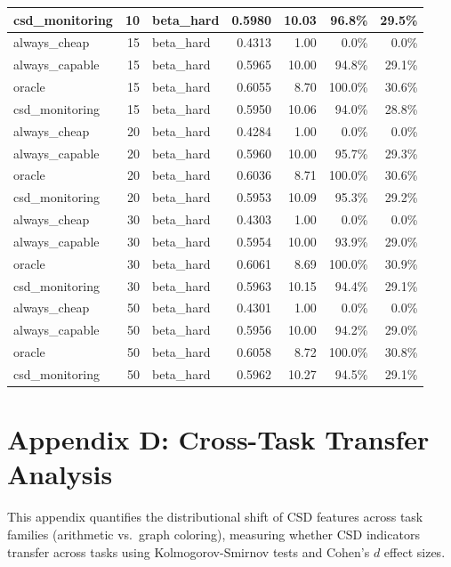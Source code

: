 \documentclass[11pt]{article}
\begin{document}
\begin{table}[h]
\begin{tabular}{l|r|l|r|r|r|r}
\midrule
csd\_monitoring & 10 & beta\_hard & 0.5980 & 10.03 & 96.8\% & 29.5\% \\
\midrule
always\_cheap & 15 & beta\_hard & 0.4313 & 1.00 & 0.0\% & 0.0\% \\
\midrule
always\_capable & 15 & beta\_hard & 0.5965 & 10.00 & 94.8\% & 29.1\% \\
\midrule
oracle & 15 & beta\_hard & 0.6055 & 8.70 & 100.0\% & 30.6\% \\
\midrule
csd\_monitoring & 15 & beta\_hard & 0.5950 & 10.06 & 94.0\% & 28.8\% \\
\midrule
always\_cheap & 20 & beta\_hard & 0.4284 & 1.00 & 0.0\% & 0.0\% \\
\midrule
always\_capable & 20 & beta\_hard & 0.5960 & 10.00 & 95.7\% & 29.3\% \\
\midrule
oracle & 20 & beta\_hard & 0.6036 & 8.71 & 100.0\% & 30.6\% \\
\midrule
csd\_monitoring & 20 & beta\_hard & 0.5953 & 10.09 & 95.3\% & 29.2\% \\
\midrule
always\_cheap & 30 & beta\_hard & 0.4303 & 1.00 & 0.0\% & 0.0\% \\
\midrule
always\_capable & 30 & beta\_hard & 0.5954 & 10.00 & 93.9\% & 29.0\% \\
\midrule
oracle & 30 & beta\_hard & 0.6061 & 8.69 & 100.0\% & 30.9\% \\
\midrule
csd\_monitoring & 30 & beta\_hard & 0.5963 & 10.15 & 94.4\% & 29.1\% \\
\midrule
always\_cheap & 50 & beta\_hard & 0.4301 & 1.00 & 0.0\% & 0.0\% \\
\midrule
always\_capable & 50 & beta\_hard & 0.5956 & 10.00 & 94.2\% & 29.0\% \\
\midrule
oracle & 50 & beta\_hard & 0.6058 & 8.72 & 100.0\% & 30.8\% \\
\midrule
csd\_monitoring & 50 & beta\_hard & 0.5962 & 10.27 & 94.5\% & 29.1\% \\
\bottomrule
\end{tabular}
\end{table}


\clearpage


\section{Appendix D: Cross-Task Transfer Analysis}
\label{app:transfer}

This appendix quantifies the distributional shift of CSD features across
task families (arithmetic vs.\ graph coloring), measuring whether
CSD indicators transfer across tasks using Kolmogorov-Smirnov tests
and Cohen's $d$ effect sizes.
\end{document}
